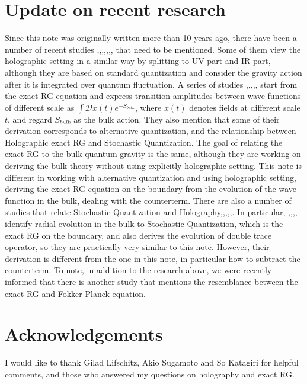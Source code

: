 \documentclass[12pt,epsbox]{article}
\numberwithin{equation}{section}
\begin{document}
\section{Update on recent research}
Since this note was originally written more than 10 years ago, there have been a number of recent studies \cite{Sin}\cite{Balasubramanian},\cite{Leigh},\cite{Sathiapalan1},\cite{Sathiapalan2},\cite{Sathiapalan3},\cite{Sathiapalan4},\cite{Sathiapalan5}\cite{Sathiapalan6}, that need to be mentioned.
Some of them \cite{Sin}\cite{Balasubramanian} view the holographic setting in a similar way by splitting to UV part and IR part, although they are based on standard quantization and consider the gravity action after it is integrated over quantum fluctuation.
A series of studies \cite{Sathiapalan1},\cite{Sathiapalan2},\cite{Sathiapalan3},\cite{Sathiapalan4},\cite{Sathiapalan5},\cite{Sathiapalan6} start from the exact RG equation and express transition amplitudes between wave functions of different scale as $\int \mathcal{D}x(t) e^{-S_{bulk}}$, where $x(t)$ denotes fields at different scale $t$, and regard $S_{bulk}$ as the bulk action. They also mention that some of their derivation corresponds to alternative quantization\cite{Sathiapalan2}, and the relationship between Holographic exact RG and Stochastic Quantization\cite{Sathiapalan5}.
The goal of relating the exact RG to the bulk quantum gravity is the same, although they are working on deriving the bulk theory without using explicitly holographic setting.
This note is different in working with alternative quantization and using holographic setting, deriving the exact RG equation on the boundary from the evolution of the wave function in the bulk, dealing with the counterterm.
There are also a number of studies that relate Stochastic Quantization and Holography\cite{SQ1},\cite{SQ2},\cite{SQ3},\cite{SQ4},\cite{SQ5},\cite{SQ6}. In particular, \cite{SQ2},\cite{SQ3},\cite{SQ4},\cite{SQ5},\cite{SQ6} identify radial evolution in the bulk to Stochastic Quantization, which is the exact RG on the boundary, and also derives the evolution of double trace operator, so they are practically very similar to this note. However, their derivation is different from the one in this note, in particular how to subtract the counterterm.
To note, in addition to the research above, we were recently informed that there is another study that mentions the resemblance between the exact RG and Fokker-Planck equation\cite{Hatta}.

\section*{Acknowledgements}
I would like to thank Gilad Lifschitz, Akio Sugamoto and So Katagiri for helpful comments, and those who answered my questions on holography and exact RG.
\end{document}
